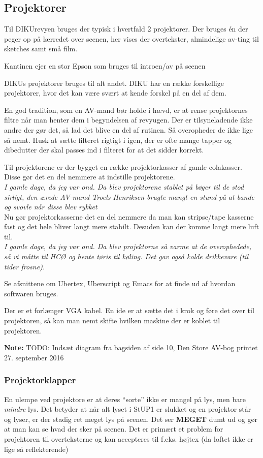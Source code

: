 \documentclass[10pt,a4paper,danish]{article}
\newcommand{\note}[1]{\begin{mdframed}[style=note]\textbf{Note:}
    #1\end{mdframed}}
\begin{document}
\subsection{Projektorer}
Til DIKUrevyen bruges der typisk i hvertfald 2 projektorer.
Der bruges én der peger op på lærredet over scenen, her vises der overtekster,
almindelige av-ting til sketches samt små film.

Kantinen ejer en stor Epson som bruges til introen/av på scenen

DIKUs projektorer bruges til alt andet.
DIKU har en række forskellige projektorer, hvor det kan være svært at kende
forskel på en del af dem.

En god tradition, som en AV-mand bør holde i hævd, er at rense projektornes filtre
når man henter dem i begyndelsen af revyugen.
Der er tilsyneladende ikke andre der gør det, så lad det blive en del af
rutinen. Så overopheder de ikke lige så nemt.
Husk at sætte filteret rigtigt i igen, der er ofte mange tapper og dibedutter
der skal passes ind i filteret for at det sidder korrekt.


Til projektorene er der bygget en række projektorkasser af gamle colakasser.
Disse gør det en del nemmere at indstille projektorene.\\
\textit{I gamle dage, da jeg var ond. Da blev projektorene stablet på bøger til
  de stod sirligt, den ærede AV-mand Troels Henriksen brugte mangt en stund på
  at bande og svovle når disse blev rykket}\\
Nu gør projektorkasserne det en del nemmere da man kan stripse/tape kasserne
fast og det hele bliver langt mere stabilt.
Desuden kan der komme langt mere luft til.\\
\textit{I gamle dage, da jeg var ond. Da blev projektorne så varme at de
  overophedede, så vi måtte til HCØ og hente tøris til køling. Det gav også
  kolde drikkevare (til tider frosne).}

Se afsnittene om Ubertex, Uberscript og Emacs for at finde ud af hvordan
softwaren bruges.

Der er et forlænger VGA kabel.
En ide er at sætte det i krok og føre det over til projektoren, så kan man nemt
skifte hvilken maskine der er koblet til projektoren.
\note{TODO: Indsæt diagram fra bagsiden af side 10, Den Store AV-bog printet 27.
  september 2016}

\subsubsection{Projektorklapper}
En ulempe ved projektore er at deres ``sorte'' ikke er mangel på lys, men bare
\textit{mindre} lys. Det betyder at når alt lyset i StUP1 er slukket og en
projektor står og lyser, er der stadig ret meget lys på scenen. Det ser
\textbf{MEGET} dumt ud og gør at man kan se hvad der sker på scenen.
Det er primært et problem for projektoren til overteksterne og kan accepteres
til f.eks. højtex (da loftet ikke er lige så reflekterende)
\end{document}
